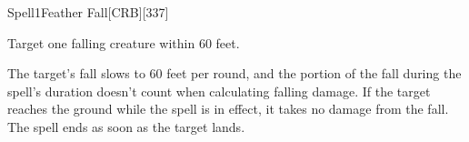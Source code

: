 
\begin{card}{Spell}{1}{Feather Fall}[CRB][337]





Target one falling creature within 60 feet.

The target's fall slows to 60 feet per round, and the portion of the fall during the spell's duration doesn't count when calculating falling damage.
If the target reaches the ground while the spell is in effect, it takes no damage from the fall.
The spell ends as soon as the target lands.
\end{card}
